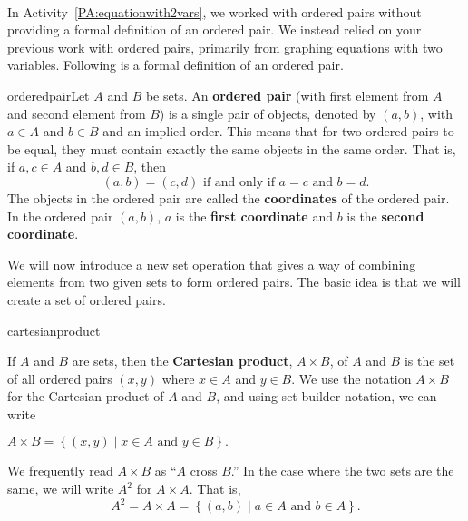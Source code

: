\begin{previewactivity}\label{PA:cartesianproduct} \hfill \\
\label{prev54-cartesian}
In \typeu Activity~\ref*{PA:equationwith2vars}, we worked with ordered pairs without providing a formal definition of an ordered pair.  We instead relied on your previous work with ordered pairs, primarily from graphing equations with two variables.  Following is a formal definition of an ordered pair.

\begin{defbox}{orderedpair}{Let $A$ and $B$ be sets.  An \textbf{ordered pair}
%
 (with first element from $A$ and second element from $B$) is a single pair of objects, denoted by  
$(a, b)$\label{sym:orderedpair}, with $a \in A$ and $b \in B$ and an implied order.  This means that for two ordered pairs to be equal, they must contain exactly the same objects in the same order.  That is, if 
$a, c \in A$ and $b, d \in B$, then  
\[
\left( {a,b} \right) = \left( {c,d} \right)  \text{ if and only if }  a = c \text{ and } b = d.  
\] 
The objects in the ordered pair are called the \textbf{coordinates}
%
 of the ordered pair.  In the ordered pair  $\left( {a,b} \right)$,  $a$  is the \textbf{first coordinate} and  $b$  is the \textbf{second coordinate}.}
\end{defbox}

We will now introduce a new set operation that gives a way of combining elements from two given sets to form ordered pairs.  The basic idea is that we will create a set of ordered pairs.
  
\begin{defbox}{cartesianproduct}{If  $A$  and  $B$  are sets, then the \textbf{Cartesian product},
%
 $A \times B$, of  $A$  and  $B$  is the set of all ordered pairs  $\left( {x,y} \right)$ where  $x \in A$ and  $y \in B$.  We use the notation $A \times B$ for the Cartesian product of $A$ and $B$, and using  set builder notation, we can write
\begin{center}
$A \times B = \left\{ { {\left( {x,y} \right)} \mid x \in A\text{ and }y \in B} \right\}.$
\end{center}
\label{sym:cartprod}
We frequently read  $A \times B$ as  ``$A$  cross  $B$.''
In the case where the two sets are the same, we will write  $A^2 $ for  $A \times A$.  That is,
\[
A^2  = A \times A = \left\{ {\left( {a,b} \right) \mid a \in A\text{ and }b \in A} \right\}.
\]}
\end{defbox}


\end{previewactivity}
